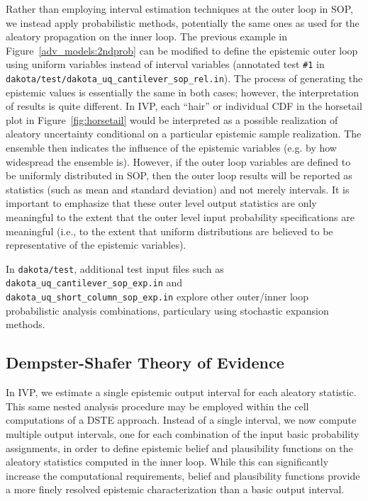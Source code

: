 Rather than employing interval estimation techniques at the outer loop
in SOP, we instead apply probabilistic methods, potentially the same
ones as used for the aleatory propagation on the inner loop. 
The previous example in Figure~\ref{adv_models:2ndprob} can be
modified to define the epistemic outer loop using uniform variables
instead of interval variables (annotated test \texttt{\#1} in
\texttt{dakota/test/dakota\_uq\_cantilever\_sop\_rel.in}). The process of
generating the epistemic values is essentially the same in both cases;
however, the interpretation of results is quite different. In IVP,
each ``hair'' or individual CDF in the horsetail plot in
Figure~\ref{fig:horsetail} would be interpreted as a possible
realization of aleatory uncertainty conditional on a particular
epistemic sample realization. The ensemble then indicates the
influence of the epistemic variables (e.g. by how widespread the
ensemble is). However, if the outer loop variables are defined to be
uniformly distributed in SOP, then the outer loop results will be
reported as statistics (such as mean and standard deviation) and not
merely intervals. It is important to emphasize that these outer level
output statistics are only meaningful to the extent that the outer
level input probability specifications are meaningful (i.e., to the
extent that uniform distributions are believed to be representative 
of the epistemic variables).

In \texttt{dakota/test}, additional test input files such as
\texttt{dakota\_uq\_cantilever\_sop\_exp.in} and\\
\texttt{dakota\_uq\_short\_column\_sop\_exp.in} explore other outer/inner
loop probabilistic analysis combinations, particulary using stochastic
expansion methods.

\subsection{Dempster-Shafer Theory of Evidence} \label{adv_models:mixed_uq:dste}

In IVP, we estimate a single epistemic output interval for each
aleatory statistic. This same nested analysis procedure may be
employed within the cell computations of a DSTE approach. Instead of
a single interval, we now compute multiple output intervals, one for
each combination of the input basic probability assignments, in order
to define epistemic belief and plausibility functions on the aleatory
statistics computed in the inner loop. While this can significantly
increase the computational requirements, belief and plausibility
functions provide a more finely resolved epistemic characterization
than a basic output interval.

